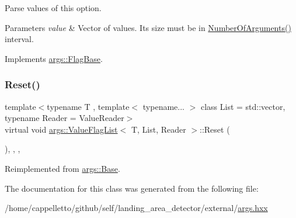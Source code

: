 Parse values of this option.


\begin{DoxyParams}{Parameters}
{\em value} & Vector of values. It\textquotesingle{}s size must be in \hyperlink{classargs_1_1_value_flag_base_a96a10bfb949ad175dcf2ffba6a6ec3b6}{Number\+Of\+Arguments()} interval. \\
\hline
\end{DoxyParams}


Implements \hyperlink{classargs_1_1_flag_base_a3421d9a595c9426dc73f62604cdee84f}{args\+::\+Flag\+Base}.

\mbox{\label{classargs_1_1_value_flag_list_aa28bb85e0c850c0959b2387bdebd7b8f}} 
\subsubsection{\texorpdfstring{Reset()}{Reset()}}
{\footnotesize\ttfamily template$<$typename T , template$<$ typename... $>$ class List = std\+::vector, typename Reader  = Value\+Reader$>$ \\
virtual void \hyperlink{classargs_1_1_value_flag_list}{args\+::\+Value\+Flag\+List}$<$ T, List, Reader $>$\+::Reset (\begin{DoxyParamCaption}{ }\end{DoxyParamCaption})\hspace{0.3cm}{\ttfamily [inline]}, {\ttfamily [override]}, {\ttfamily [virtual]}, {\ttfamily [noexcept]}}



Reimplemented from \hyperlink{classargs_1_1_base_ac7cfc851174f71e00173121d3013dab1}{args\+::\+Base}.



The documentation for this class was generated from the following file\+:\begin{DoxyCompactItemize}
\item 
/home/cappelletto/github/self/landing\+\_\+area\+\_\+detector/external/\hyperlink{args_8hxx}{args.\+hxx}\end{DoxyCompactItemize}
